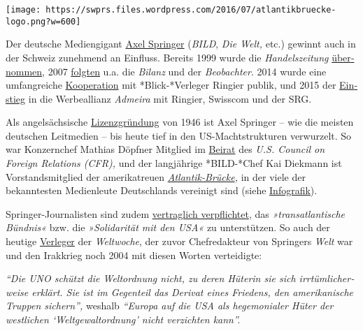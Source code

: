 \texttt{[image: https://swprs.files.wordpress.com/2016/07/atlantikbruecke-logo.png?w=600]}

Der deutsche Medien­gigant
\href{https://de.wikipedia.org/wiki/Axel_Springer_SE}{Axel Springer}
(\emph{BILD}, \emph{Die Welt,} etc.) gewinnt auch in der Schweiz
zu­neh­mend an Einfluss. Bereits 1999 wurde die \emph{Handels­zeitung}
\href{https://de.wikipedia.org/wiki/Handelszeitung}{über­nommen}, 2007
\href{https://de.wikipedia.org/wiki/Jean_Frey_AG}{folgten} u.a. die
\emph{Bilanz} und der \emph{Beobachter}. 2014 wurde eine umfang­reiche
\href{http://www.blick.ch/news/wirtschaft/medien-ringier-und-axel-springer-gruenden-gemeinschaftsunternehmen-in-der-schweiz-id3357037.html}{Koope­ration}
mit *Blick-*Verleger Ringier publik, und 2015 der
\href{http://www.persoenlich.com/marketing/die-werbeallianz-prasentiert-sich-zum-ersten-mal-der-branche}{Ein­stieg}
in die Werbe­allianz \emph{Admeira} mit Ringier, Swiss­com und der SRG.

Als angel­säch­sische
\href{https://de.wikipedia.org/wiki/Lizenzzeitung}{Li­zenz­grün­dung}
von 1946 ist Axel Springer -- wie die meisten deutschen Leit­medien --
bis heute tief in den US-Macht­­struk­turen ver­wur­zelt. So war
Konzern­­chef Mathias Döpfner Mit­glied im
\href{https://www.cfr.org/global-board-advisors}{Bei­rat} des \emph{U.S.
Council on Foreign Relations (CFR),} und der lang­jährige *BILD-*​Chef
Kai Diek­­mann ist Vor­stands­mitglied der ame­ri­ka­treuen
\emph{\href{https://de.wikipedia.org/wiki/Atlantik-Br\%C3\%BCcke}{Atlantik-Brücke},}
in der viele der bekanntesten Medien­leute Deutsch­lands ver­ei­nigt
sind (siehe
\href{https://swprs.org/netzwerk-medien-deutschland/}{Infografik}).

Springer-Journa­listen sind zudem
\href{https://bildblog.de/89290/axel-springer-gibt-sich-neue-alte-grundsaetze/}{ver­­trag­­lich
ver­pfli­ch­tet}, das \emph{»trans­at­lantische Bündnis«} bzw. die
\emph{»Soli­da­rität mit den USA«} zu unter­stützen. So auch der heutige
\href{https://de.wikipedia.org/wiki/Roger_K\%C3\%B6ppel}{Ver­leger} der
\emph{Welt­woche}, der zuvor Chef­re­dakteur von Springers \emph{Welt}
war und den Irak­krieg noch 2004 mit diesen Worten ver­tei­digte:

\emph{``Die UNO schützt die Welt­ordnung nicht, zu deren Hüterin sie
sich irr­tüm­licher­weise erklärt. Sie ist im Gegen­teil das Derivat
eines Friedens, den ameri­ka­nische Truppen sichern'',} weshalb
\emph{``Europa auf die USA als hege­mon­ialer Hüter der west­lichen
`Welt­gewalt­ordnung' nicht ver­zichten kann''.}

